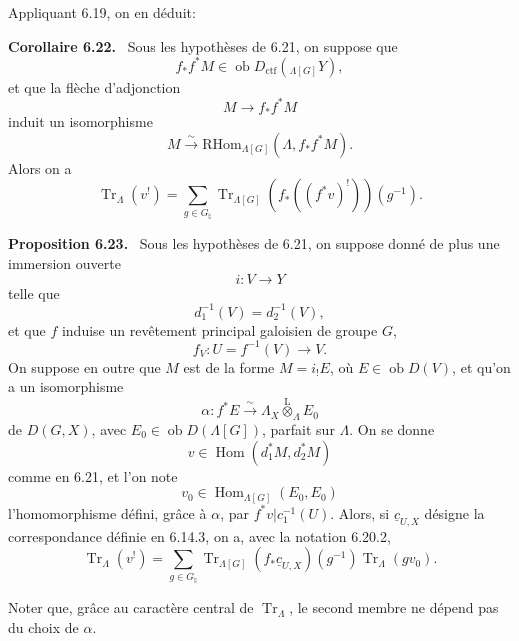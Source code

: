 \documentclass[11pt]{article}
\newenvironment{statement}[1]{\par\medskip\noindent\textbf{#1.}\ }{\par\medskip}
\DeclareMathOperator{\Hom}{Hom}
\providecommand{\RHom}{\mathrm{RHom}}
\providecommand{\Tr}{\operatorname{Tr}}
\providecommand{\Tr}{\operatorname{Tr}}
\providecommand{\lten}{\overset{\mathrm L}{\otimes}}
\providecommand{\Ob}{\operatorname{ob}}
\providecommand{\Tr}{\operatorname{Tr}}
\providecommand{\RHom}{\mathrm{RHom}}
\providecommand{\Hom}{\operatorname{Hom}}
\providecommand{\lten}{\overset{\mathrm L}{\otimes}}
\providecommand{\RHom}{\mathrm R\mathcal{H}om}
\providecommand{\lten}{\overset{\mathrm L}{\otimes}}
\providecommand{\Ob}{\operatorname{ob}}
\providecommand{\Tr}{\operatorname{Tr}}
\providecommand{\lten}{\overset{\mathrm L}{\otimes}}
\providecommand{\lten}{\overset{\mathrm L}{\otimes}}
\providecommand{\Ob}{\operatorname{Ob}}
\providecommand{\lten}{\overset{\mathrm L}{\otimes}}
\begin{document}
Appliquant 6.19, on en déduit:

\begin{statement}{Corollaire 6.22}
Sous les hypothèses de 6.21, on suppose que
\[
f_*f^*M\in\Ob D_{\mathrm{ctf}}({}_{\Lambda[G]}Y),
\]
et que la flèche d'adjonction
\[
M\to f_*f^*M
\]
induit un isomorphisme
\[
M\xrightarrow{\sim}\RHom_{\Lambda[G]}(\Lambda,f_*f^*M).
\]
Alors on a
\begin{equation}
\Tr_{\Lambda}(v^!)=
\sum_{g\in G_{\natural}}\Tr_{\Lambda[G]}(f_*((f^*v)^!))(g^{-1}).
\tag{6.22.1}
\end{equation}
\end{statement}

\begin{statement}{Proposition 6.23}
Sous les hypothèses de 6.21, on suppose donné de plus une immersion ouverte
\[
i:V\to Y
\]
telle que
\[
d_1^{-1}(V)=d_2^{-1}(V),
\]
et que $f$ induise un revêtement principal galoisien de groupe $G$,
\[
f_V:U=f^{-1}(V)\to V.
\]
On suppose en outre que $M$ est de la forme $M=i_!E$, où $E\in\Ob D(V)$, et qu'on a un isomorphisme
\[
\alpha:f^*E\xrightarrow{\sim}\Lambda_X\lten_{\Lambda}E_0
\]
de $D(G,X)$, avec $E_0\in\Ob D(\Lambda[G])$, parfait sur $\Lambda$. On se donne
\[
v\in\Hom(d_1^*M,d_2^*M)
\]
comme en 6.21, et l'on note
\[
v_0\in\Hom_{\Lambda[G]}(E_0,E_0)
\]
l'homomorphisme défini, grâce à $\alpha$, par $f^*v|c_1^{-1}(U)$. Alors, si $\underline c_{U,X}$ désigne la correspondance définie en 6.14.3, on a, avec la notation 6.20.2,
\begin{equation}
\Tr_{\Lambda}(v^!)
=
\sum_{g\in G_{\natural}}
\Tr_{\Lambda[G]}(f_*\underline c_{U,X})(g^{-1})\Tr_{\Lambda}(gv_0).
\tag{6.23.1}
\end{equation}
\end{statement}

Noter que, grâce au caractère central de $\Tr_{\Lambda}$, le second membre ne dépend pas du choix de $\alpha$.
\end{document}
